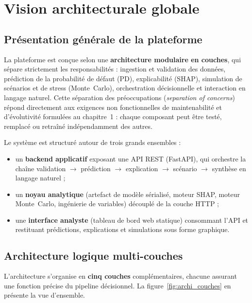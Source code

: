 \section{Vision architecturale globale}

\subsection{Présentation générale de la plateforme}

La plateforme est conçue selon une \textbf{architecture modulaire en couches}, qui
sépare strictement les responsabilités : ingestion et validation des données,
prédiction de la probabilité de défaut (PD), explicabilité (SHAP), simulation de
scénarios et de stress (Monte~Carlo), orchestration décisionnelle et interaction en
langage naturel. Cette séparation des préoccupations
(\textit{separation of concerns}) répond directement aux exigences non
fonctionnelles de maintenabilité et d'évolutivité formulées au chapitre~1 : chaque
composant peut être testé, remplacé ou retraîné indépendamment des autres.

Le système est structuré autour de trois grands ensembles :

\begin{itemize}
  \item un \textbf{backend applicatif} exposant une API REST (FastAPI), qui
        orchestre la chaîne validation $\rightarrow$ prédiction $\rightarrow$
        explication $\rightarrow$ scénario $\rightarrow$ synthèse en langage naturel ;
  \item un \textbf{noyau analytique} (artefact de modèle sérialisé, moteur SHAP,
        moteur Monte~Carlo, ingénierie de variables) découplé de la couche HTTP ;
  \item une \textbf{interface analyste} (tableau de bord web statique) consommant
        l'API et restituant prédictions, explications et simulations sous forme
        graphique.
\end{itemize}

\subsection{Architecture logique multi-couches}

L'architecture s'organise en \textbf{cinq couches} complémentaires, chacune assurant
une fonction précise du pipeline décisionnel. La figure~\ref{fig:archi_couches}
en présente la vue d'ensemble.

